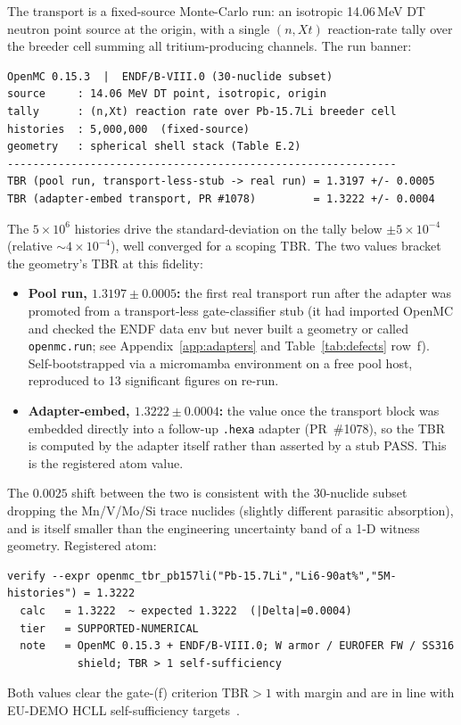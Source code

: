 The transport is a fixed-source Monte-Carlo run: an isotropic 14.06\,MeV DT
neutron point source at the origin, with a single $(n,Xt)$ reaction-rate
tally over the breeder cell summing all tritium-producing channels. The run
banner:
\begin{lstlisting}
OpenMC 0.15.3  |  ENDF/B-VIII.0 (30-nuclide subset)
source     : 14.06 MeV DT point, isotropic, origin
tally      : (n,Xt) reaction rate over Pb-15.7Li breeder cell
histories  : 5,000,000  (fixed-source)
geometry   : spherical shell stack (Table E.2)
-------------------------------------------------------------
TBR (pool run, transport-less-stub -> real run) = 1.3197 +/- 0.0005
TBR (adapter-embed transport, PR #1078)         = 1.3222 +/- 0.0004
\end{lstlisting}
The $5\times10^{6}$ histories drive the standard-deviation on the tally below
$\pm5\times10^{-4}$ (relative $\sim4\times10^{-4}$), well converged for a
scoping TBR. The two values bracket the geometry's TBR at this fidelity:
\begin{itemize}\itemsep0.15em
\item \textbf{Pool run, $1.3197\pm0.0005$:} the first real transport run after
  the adapter was promoted from a transport-less gate-classifier stub (it had
  imported OpenMC and checked the ENDF data env but never built a geometry or
  called \texttt{openmc.run}; see Appendix~\ref{app:adapters} and
  Table~\ref{tab:defects} row~f). Self-bootstrapped via a micromamba
  environment on a free pool host, reproduced to 13 significant figures on
  re-run.
\item \textbf{Adapter-embed, $1.3222\pm0.0004$:} the value once the transport
  block was embedded directly into a follow-up \texttt{.hexa} adapter
  (PR~\#1078), so the TBR is computed by the adapter itself rather than asserted
  by a stub PASS. This is the registered atom value.
\end{itemize}
The $0.0025$ shift between the two is consistent with the 30-nuclide subset
dropping the Mn/V/Mo/Si trace nuclides (slightly different parasitic
absorption), and is itself smaller than the engineering uncertainty band of a
1-D witness geometry. Registered atom:
\begin{lstlisting}
verify --expr openmc_tbr_pb157li("Pb-15.7Li","Li6-90at%","5M-histories") = 1.3222
  calc   = 1.3222  ~ expected 1.3222  (|Delta|=0.0004)
  tier   = SUPPORTED-NUMERICAL
  note   = OpenMC 0.15.3 + ENDF/B-VIII.0; W armor / EUROFER FW / SS316
           shield; TBR > 1 self-sufficiency
\end{lstlisting}
Both values clear the gate-(f) criterion $\text{TBR}>1$ with margin and are in
line with EU-DEMO HCLL self-sufficiency targets~\citep{fischer2019eudemoTBR}.

